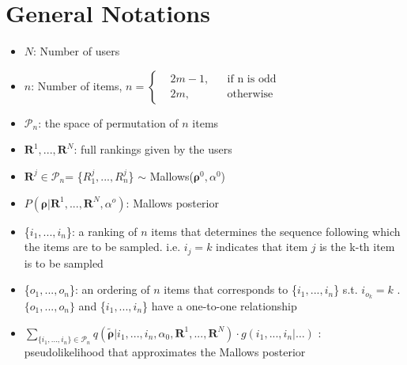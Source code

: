 \documentclass[11pt, oneside]{article}   	%
\title{}
\author{}
\date{}							%
\begin{document}
\maketitle
\section{General Notations}

\begin{itemize}

	\item {$N$: Number of users}
	
	\item {$n$: Number of items,    $
	n = \left \{
	\begin{aligned}
	&2m-1, && \text{if n is odd} \\
	&2m, && \text{otherwise}
	\end{aligned} \right.
	$}
	
	\item{$\mathcal{P}_n$: the space of permutation of $n$ items}
	\item {$\bm{R}^1,...,\bm{R}^N$: full rankings given by the users}
	
	
	\item {$\bm{R}^j \in \mathcal{P}_n$= \{$R^j_1,...,R^j_n$\} $\sim$ Mallows($\bm{\rho}^0, \alpha^0$)}
	
	
	\item {$P(\bm{\rho}|\bm{R}^1,...,\bm{R}^N,\alpha^o)$: Mallows posterior}
	
	
	\item{\{$i_1, ..., i_n$\}: a ranking of $n$ items that determines the sequence following which the items are to be sampled. i.e. $i_j = k$ indicates that item $j$ is the k-th item is to be sampled}
	
	\item{ \{$o_1, ..., o_n$\}: an ordering of $n$ items that corresponds to \{$i_1, ..., i_n$\} s.t. $i_{o_k} = k$ }. $\{o_1, ...,o_n\}$ and \{$i_1, ..., i_n$\} have a one-to-one relationship
	
	\item {$\sum\limits_{\{i_1, ..., i_n \}\in \mathcal{P}_n }q(\tilde{\bm{\rho}}|i_1, ..., i_n, \alpha_0, \bm{R}^1, ...,\bm{R}^N) \cdot g(i_1, ..., i_n| \dots)$ : pseudolikelihood that approximates the Mallows posterior}
	

\end{itemize}
\end{document}
